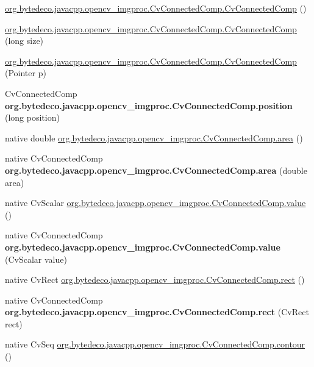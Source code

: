 \begin{DoxyCompactItemize}
\item 
\hyperlink{group__imgproc_ga1105093a8f885cea9506ce309f08ca16}{org.\+bytedeco.\+javacpp.\+opencv\+\_\+imgproc.\+Cv\+Connected\+Comp.\+Cv\+Connected\+Comp} ()
\item 
\hyperlink{group__imgproc_ga2439ac8c5f34b2228d9ff08c3f549945}{org.\+bytedeco.\+javacpp.\+opencv\+\_\+imgproc.\+Cv\+Connected\+Comp.\+Cv\+Connected\+Comp} (long size)
\item 
\hyperlink{group__imgproc_gae571423a672ebb676a5e859ce17ec64a}{org.\+bytedeco.\+javacpp.\+opencv\+\_\+imgproc.\+Cv\+Connected\+Comp.\+Cv\+Connected\+Comp} (Pointer p)
\item 
\mbox{\label{group__imgproc_gaee6f65a73bd5d558353f5aa42fab1c8f}} 
Cv\+Connected\+Comp {\bfseries org.\+bytedeco.\+javacpp.\+opencv\+\_\+imgproc.\+Cv\+Connected\+Comp.\+position} (long position)
\item 
native double \hyperlink{group__imgproc_ga3782e365b543229fa6197c24f96e17c7}{org.\+bytedeco.\+javacpp.\+opencv\+\_\+imgproc.\+Cv\+Connected\+Comp.\+area} ()
\item 
\mbox{\label{group__imgproc_ga3fabda4845b189006976caf5e98c7a3c}} 
native Cv\+Connected\+Comp {\bfseries org.\+bytedeco.\+javacpp.\+opencv\+\_\+imgproc.\+Cv\+Connected\+Comp.\+area} (double area)
\item 
native Cv\+Scalar \hyperlink{group__imgproc_ga16cecb494a3d7f7784b053b6d9348d29}{org.\+bytedeco.\+javacpp.\+opencv\+\_\+imgproc.\+Cv\+Connected\+Comp.\+value} ()
\item 
\mbox{\label{group__imgproc_gabf13a8e6ff510e5d628493ae36a98a6c}} 
native Cv\+Connected\+Comp {\bfseries org.\+bytedeco.\+javacpp.\+opencv\+\_\+imgproc.\+Cv\+Connected\+Comp.\+value} (Cv\+Scalar value)
\item 
native Cv\+Rect \hyperlink{group__imgproc_ga1505cdc461c1c929ad7ee5f2df4b166e}{org.\+bytedeco.\+javacpp.\+opencv\+\_\+imgproc.\+Cv\+Connected\+Comp.\+rect} ()
\item 
\mbox{\label{group__imgproc_gaaccc890613acaac70c9ea757fe125f35}} 
native Cv\+Connected\+Comp {\bfseries org.\+bytedeco.\+javacpp.\+opencv\+\_\+imgproc.\+Cv\+Connected\+Comp.\+rect} (Cv\+Rect rect)
\item 
native Cv\+Seq \hyperlink{group__imgproc_gaa5beffb2969f60796398e17dcb7f8700}{org.\+bytedeco.\+javacpp.\+opencv\+\_\+imgproc.\+Cv\+Connected\+Comp.\+contour} ()

\end{DoxyCompactItemize}
